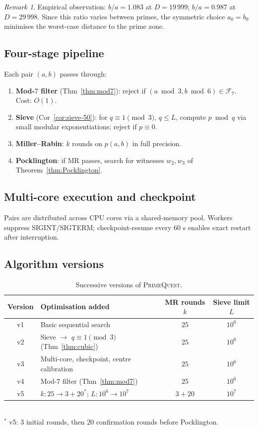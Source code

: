 \documentclass[11pt,a4paper]{article}
\theoremstyle{definition}
\theoremstyle{remark}
\newtheorem{remark}[theorem]{Remark}
\newcommand{\F}{\mathcal{F}}
\begin{document}
\begin{remark}
Empirical observation: $b/a = 1.083$ at $D=19\,999$; $b/a = 0.987$ at
$D=29\,998$. Since this ratio varies between primes, the symmetric choice
$a_0=b_0$ minimises the worst-case distance to the prime zone.
\end{remark}

\subsection{Four-stage pipeline}

Each pair $(a,b)$ passes through:
\begin{enumerate}
\item \textbf{Mod-$7$ filter} (Thm~\ref{thm:mod7}): reject if
  $(a\bmod 3,b\bmod 6)\in\F_7$. Cost: $O(1)$.
\item \textbf{Sieve} (Cor~\ref{cor:sieve-50}): for $q\equiv 1\pmod{3}$,
  $q\leq L$, compute $p\bmod q$ via small modular exponentiations; reject
  if $p\equiv 0$.
\item \textbf{Miller--Rabin}: $k$ rounds on $p(a,b)$ in full precision.
\item \textbf{Pocklington}: if MR passes, search for witnesses
  $w_2,w_3$ of Theorem~\ref{thm:Pocklington}.
\end{enumerate}

\subsection{Multi-core execution and checkpoint}

Pairs are distributed across CPU cores via a shared-memory pool. Workers
suppress SIGINT/SIGTERM; checkpoint-resume every $60$ s enables exact
restart after interruption.

\subsection{Algorithm versions}

\begin{table}[ht]\centering
\caption{Successive versions of \textsc{PrimeQuest}.}
\label{tab:versions}
\begin{tabular}{@{}clcc@{}}
\toprule
Version & Optimisation added & MR rounds $k$ & Sieve limit $L$ \\
\midrule
v1 & Basic sequential search & $25$ & $10^6$ \\
v2 & Sieve $\to$ $q\equiv 1\pmod{3}$ (Thm~\ref{thm:cubic}) & $25$ & $10^6$ \\
v3 & Multi-core, checkpoint, centre calibration & $25$ & $10^6$ \\
v4 & Mod-$7$ filter (Thm~\ref{thm:mod7}) & $25$ & $10^6$ \\
v5 & $k\colon 25\to 3+20^{*}$; $L\colon 10^6\to 10^7$ & $3+20$ & $10^7$ \\
\bottomrule
\end{tabular}\\[3pt]
\footnotesize $^{*}$ v5: $3$ initial rounds, then $20$ confirmation rounds
before Pocklington.
\end{table}
\end{document}
